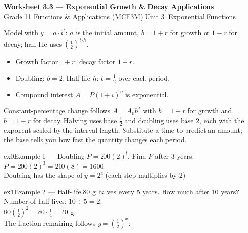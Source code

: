 \documentclass[11pt]{article}
\begin{document}
\begin{center}
{\LARGE\bfseries\color{titleblue}Worksheet 3.3 --- Exponential Growth \& Decay Applications}\\[2pt]
{\small Grade 11 Functions \& Applications (MCF3M) \textperiodcentered{} Unit 3: Exponential Functions}
\end{center}

\begin{ideabox}
Model with $y=a\cdot b^t$: $a$ is the initial amount, $b=1+r$ for growth or $1-r$ for decay; half-life uses $\left(\tfrac12\right)^{t/h}$.
\begin{itemize}[leftmargin=*,itemsep=2pt]
  \item Growth factor $1+r$; decay factor $1-r$.
  \item Doubling: $b=2$. Half-life $h$: $b=\tfrac12$ over each period.
  \item Compound interest $A=P(1+i)^n$ is exponential.
\end{itemize}
\end{ideabox}

\begin{learnbox}
Constant-percentage change follows $A=A_0 b^{\,t}$ with $b=1+r$ for growth and $b=1-r$ for decay.
Halving uses base $\tfrac12$ and doubling uses base $2$, each with the exponent scaled by the interval length.
Substitute a time to predict an amount; the base tells you how fast the quantity changes each period.
\end{learnbox}


\begin{example}{ex0}{Example 1 --- Doubling}
$P=200(2)^t$. Find $P$ after 3 years.\soln $P=200(2)^3=200(8)=1600$. \\ Doubling has the shape of $y=2^x$ (each step multiplies by 2):
\end{example}

\begin{example}{ex1}{Example 2 --- Half-life}
80 g halves every 5 years. How much after 10 years?\soln Number of half-lives: $10\div5=2$. \\ $80\left(\tfrac12\right)^2=80\cdot\tfrac14=20$ g. \\ The fraction remaining follows $y=\left(\tfrac12\right)^x$:
\end{example}
\end{document}
